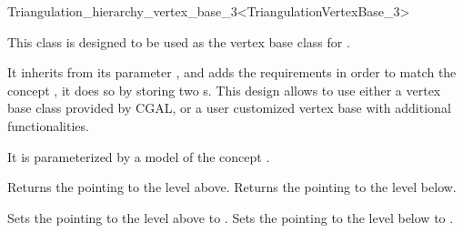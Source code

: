 

\begin{ccRefClass}{Triangulation_hierarchy_vertex_base_3<TriangulationVertexBase_3>}

\ccDefinition
  
This class is designed to be used as the vertex base class for
.

It inherits from its parameter , and adds the
requirements in order to match the concept
, it does so by storing two
s.  This design allows to use either a vertex base class
provided by CGAL, or a user customized vertex base with additional
functionalities.


\ccParameters

It is parameterized by a model of the concept .

\ccIsModel {}

\ccInheritsFrom {}


\ccAccessFunctions
{}
\ccTagFullDeclarations

{Returns the  pointing to the level above.}
\ccGlue
{}
{Returns the  pointing to the level below.}


{Sets the  pointing to the level above to .}
\ccGlue
{}
{Sets the  pointing to the level below to .}

\ccSeeAlso
{}\\

\end{ccRefClass}

